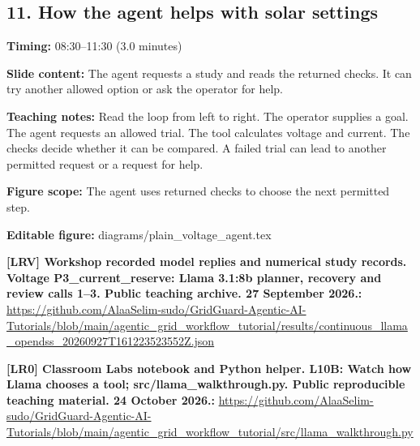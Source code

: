 \documentclass[10pt,letterpaper]{article}
\begin{document}
\subsection*{11. How the agent helps with solar settings}
\textbf{Timing:} 08:30--11:30 (3.0 minutes)\par
\textbf{Slide content:} The agent requests a study and reads the returned checks.
It can try another allowed option or ask the operator for help.\par
\textbf{Teaching notes:} Read the loop from left to right. The operator supplies a goal. The agent requests an allowed trial. The tool calculates voltage and current. The checks decide whether it can be compared. A failed trial can lead to another permitted request or a request for help.\par
\textbf{Figure scope:} The agent uses returned checks to choose the next permitted step.\par
\textbf{Editable figure:} diagrams/plain\_voltage\_agent.tex\par
\textbf{[LRV] Workshop recorded model replies and numerical study records. Voltage P3\_current\_reserve: Llama 3.1:8b planner, recovery and review calls 1--3. Public teaching archive. 27 September 2026.:} \href{https://github.com/AlaaSelim-sudo/GridGuard-Agentic-AI-Tutorials/blob/main/agentic_grid_workflow_tutorial/results/continuous_llama_opendss_20260927T161223523552Z.json}{\small\ttfamily https:/\allowbreak{}/\allowbreak{}github.\allowbreak{}com/\allowbreak{}AlaaSelim-\allowbreak{}sudo/\allowbreak{}GridGuard-\allowbreak{}Agentic-\allowbreak{}AI-\allowbreak{}Tutorials/\allowbreak{}blob/\allowbreak{}main/\allowbreak{}agentic\_\allowbreak{}grid\_\allowbreak{}workflow\_\allowbreak{}tutorial/\allowbreak{}results/\allowbreak{}continuous\_\allowbreak{}llama\_\allowbreak{}opendss\_\allowbreak{}20260927T161223523552Z.\allowbreak{}json}\par
\textbf{[LR0] Classroom Labs notebook and Python helper. L10B: Watch how Llama chooses a tool; src/llama\_walkthrough.py. Public reproducible teaching material. 24 October 2026.:} \href{https://github.com/AlaaSelim-sudo/GridGuard-Agentic-AI-Tutorials/blob/main/agentic_grid_workflow_tutorial/src/llama_walkthrough.py}{\small\ttfamily https:/\allowbreak{}/\allowbreak{}github.\allowbreak{}com/\allowbreak{}AlaaSelim-\allowbreak{}sudo/\allowbreak{}GridGuard-\allowbreak{}Agentic-\allowbreak{}AI-\allowbreak{}Tutorials/\allowbreak{}blob/\allowbreak{}main/\allowbreak{}agentic\_\allowbreak{}grid\_\allowbreak{}workflow\_\allowbreak{}tutorial/\allowbreak{}src/\allowbreak{}llama\_\allowbreak{}walkthrough.\allowbreak{}py}\par
\par\medskip
\end{document}

